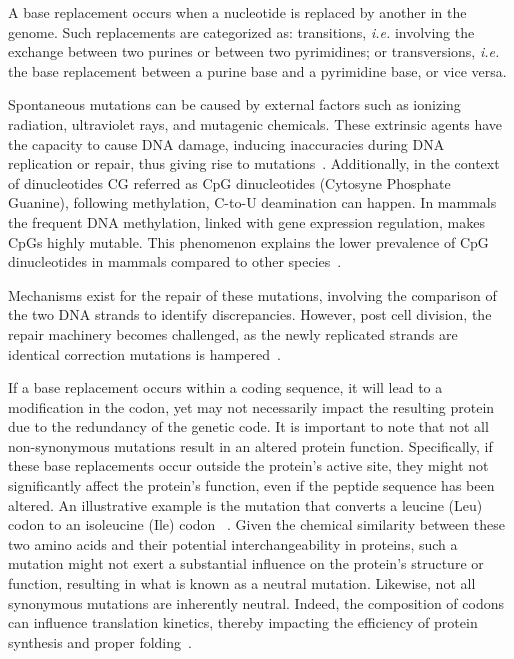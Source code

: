 A base replacement occurs when a nucleotide is replaced by another in the genome. Such replacements are categorized as: transitions, \textit{i.e.} involving the exchange between two purines or between two pyrimidines; or transversions, \textit{i.e.} the base replacement between a purine base and a pyrimidine base, or vice versa.

Spontaneous mutations can be caused by external factors such as ionizing radiation, ultraviolet rays, and mutagenic chemicals. These extrinsic agents have the capacity to cause DNA damage, inducing inaccuracies during DNA replication or repair, thus giving rise to mutations~\citep{maki_origins_2002}. Additionally, in the context of dinucleotides CG referred as \gls{CpG} dinucleotides (Cytosyne Phosphate Guanine), following methylation, C-to-U deamination can happen. In mammals the frequent DNA methylation, linked with gene expression regulation, makes \gls{CpG}s highly mutable. This phenomenon explains the lower prevalence of \gls{CpG} dinucleotides in mammals compared to other species~\citep{duncan_mutagenic_1980, brennan_hypermutability_1990}.

Mechanisms exist for the repair of these mutations, involving the comparison of the two DNA strands to identify discrepancies. However, post cell division, the repair machinery becomes challenged, as the newly replicated strands are identical correction mutations is hampered~\citep{gao_mechanisms_2017, cortez_replication-coupled_2019}.

If a base replacement occurs within a coding sequence, it will lead to a modification in the \gls{codon}, yet may not necessarily impact the resulting protein due to the redundancy of the genetic code. It is important to note that not all \gls{non-synonymous} mutations result in an altered protein function. Specifically, if these base replacements occur outside the protein's active site, they might not significantly affect the protein's function, even if the peptide sequence has been altered. An illustrative example is the mutation that converts a leucine (Leu) codon to an isoleucine (Ile) codon ~\citep{sneath_relations_1966, miyata_two_1979, epstein_non-randomness_1967}. Given the chemical similarity between these two amino acids and their potential interchangeability in proteins, such a mutation might not exert a substantial influence on the protein's structure or function, resulting in what is known as a neutral mutation. Likewise, not all synonymous mutations are inherently neutral. Indeed, the composition of \gls{codon}s can influence translation kinetics, thereby impacting the efficiency of protein synthesis and proper folding~\citep{akashi_synonymous_1994, stoletzki_synonymous_2007, drummond_mistranslation-induced_2008, plotkin_synonymous_2011, yang_codon-by-codon_2014, dana_effect_2014, gorochowski_trade-offs_2015, quax_codon_2015, presnyak_codon_2015, wu_translation_2019}.

